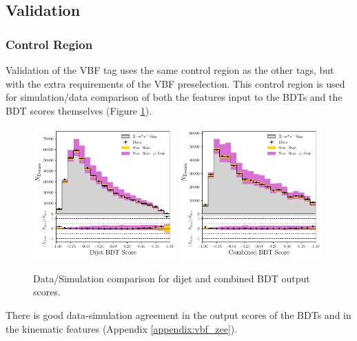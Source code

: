 \subsection{Validation}
\subsubsection{\Zee Control Region}
Validation of the VBF tag uses the same \Zee control region as the other tags, but with the extra requirements of the VBF preselection. 
This control region is used for simulation/data comparison of both the features input to the BDTs and the BDT scores themselves (Figure \ref{fig:event_categorisation:zee_bdt_score_validation}). 
\begin{figure}[h!]
    \begin{center}
        \includegraphics[width=0.49\textwidth]{figures/event_selection/dijet_BDT_zee_LPS.pdf}
        \includegraphics[width=0.49\textwidth]{figures/event_selection/combined_BDT_zee_LPS.pdf}
    \end{center}
    \caption{Data/Simulation comparison for dijet and combined BDT output scores.}
    \label{fig:event_categorisation:zee_bdt_score_validation}
\end{figure}
There is good data-simulation agreement in the output scores of the BDTs and in the kinematic features (Appendix \ref{appendix:vbf_zee}).


